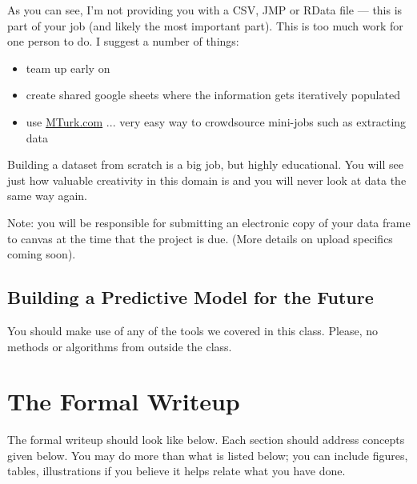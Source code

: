 \documentclass[12pt]{article}
\begin{document}
As you can see, I'm not providing you with a CSV, JMP or RData file --- this is part of your job (and likely the most important part). This is too much work for one person to do. I suggest a number of things:

\begin{itemize}
\item team up early on
\item create shared google sheets where the information gets iteratively populated
\item use \url{MTurk.com} ... very easy way to crowdsource mini-jobs such as extracting data
\end{itemize}





Building a dataset from scratch is a big job, but highly educational. You will see just how valuable creativity in this domain is and you will never look at data the same way again.

Note: you will be responsible for submitting an electronic copy of your data frame to canvas at the time that the project is due. (More details on upload specifics coming soon).

\subsection{Building a Predictive Model for the Future}

You should make use of any of the tools we covered in this class. Please, no methods or algorithms from outside the class.



\section{The Formal Writeup}

The formal writeup should look like below. Each section should address concepts given below.  You may do more than what is listed below; you can include figures, tables, illustrations if you believe it helps relate what you have done.\\
\end{document}
